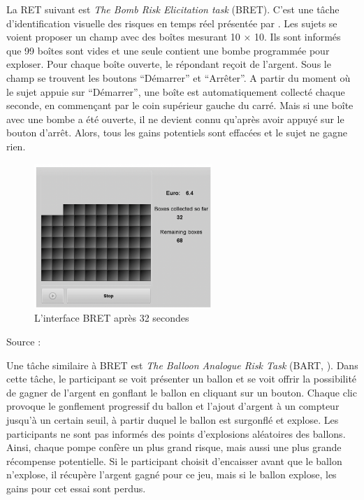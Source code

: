 \documentclass[12pt]{article}
\begin{document}
La RET suivant est \emph{The Bomb Risk Elicitation task} (BRET). C'est
une tâche d'identification visuelle des risques en temps réel présentée
par \citet{CroFil2013b}. Les sujets se voient proposer un champ avec des
boîtes mesurant 10 × 10. Ils sont informés que 99 boîtes sont vides et
une seule contient une bombe programmée pour exploser. Pour chaque boîte
ouverte, le répondant reçoit de l'argent. Sous le champ se trouvent les
boutons ``Démarrer'' et ``Arrêter''. A partir du moment où le sujet
appuie sur ``Démarrer'', une boîte est automatiquement collecté chaque
seconde, en commençant par le coin supérieur gauche du carré. Mais si
une boîte avec une bombe a été ouverte, il ne devient connu qu'après
avoir appuyé sur le bouton d'arrêt. Alors, tous les gains potentiels
sont effacées et le sujet ne gagne rien.

\begin{figure}
\centering
\includegraphics[width=0.6\textwidth,height=0.3\textheight]{BRET.png}
\caption{L'interface BRET après 32 secondes}
\end{figure}

Source : \citet{CroFil2013b}

Une tâche similaire à BRET est \emph{The Balloon Analogue Risk Task}
(BART, \citet{Lejuez2002}). Dans cette tâche, le participant se voit
présenter un ballon et se voit offrir la possibilité de gagner de
l'argent en gonflant le ballon en cliquant sur un bouton. Chaque clic
provoque le gonflement progressif du ballon et l'ajout d'argent à un
compteur jusqu'à un certain seuil, à partir duquel le ballon est
surgonflé et explose. Les participants ne sont pas informés des points
d'explosions aléatoires des ballons. Ainsi, chaque pompe confère un plus
grand risque, mais aussi une plus grande récompense potentielle. Si le
participant choisit d'encaisser avant que le ballon n'explose, il
récupère l'argent gagné pour ce jeu, mais si le ballon explose, les
gains pour cet essai sont perdus.
\end{document}
